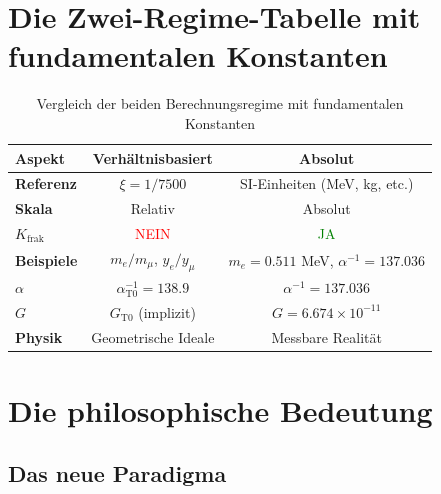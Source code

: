 	\section{Die Zwei-Regime-Tabelle mit fundamentalen Konstanten}
	
	\begin{table}[h]
		\centering
		\begin{tabular}{lcc}
			\toprule
			\textbf{Aspekt} & \textbf{Verhältnisbasiert} & \textbf{Absolut} \\
			\midrule
			\textbf{Referenz} & $\xi = 1/7500$ & SI-Einheiten (MeV, kg, etc.) \\
			\textbf{Skala} & Relativ & Absolut \\
			\textbf{$K_{\text{frak}}$} & \textcolor{red}{NEIN} & \textcolor{green}{JA} \\
			\textbf{Beispiele} & $m_e/m_μ$, $y_e/y_μ$ & $m_e = 0.511$ MeV, $\alpha^{-1} = 137.036$ \\
			\textbf{$\alpha$} & $\alpha_{\text{T0}}^{-1} = 138.9$ & $\alpha^{-1} = 137.036$ \\
			\textbf{$G$} & $G_{\text{T0}}$ (implizit) & $G = 6.674\times10^{-11}$ \\
			\textbf{Physik} & Geometrische Ideale & Messbare Realität \\
			\bottomrule
		\end{tabular}
		\caption{Vergleich der beiden Berechnungsregime mit fundamentalen Konstanten}
	\end{table}
	
	\section{Die philosophische Bedeutung}
	
	\subsection{Das neue Paradigma}
	
	\begin{center}
	\end{center}
	
